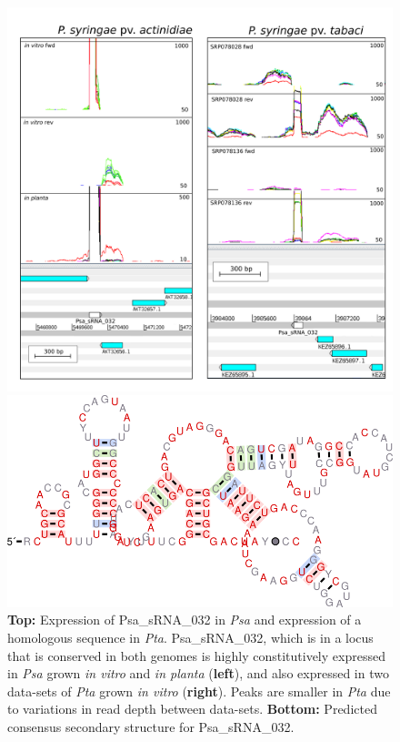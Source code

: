 \begin{figure}[H]
\centering
    \includegraphics[scale=1.05]{psa/psa_ncRNA/tabaci_and_psa.png}
    \begin{minipage}{0.6\textwidth}
\includegraphics[scale=0.9]{psa/psa_ncRNA/sRNA_032.png}
    \end{minipage}
    \begin{minipage}{0.39\textwidth}
    \caption[Expression of a Psa\_sRNA\_032 in \textit{Psa} and \textit{Pta}]{\textbf{Top:} Expression of Psa\_sRNA\_032 in \textit{Psa} and expression of a homologous sequence in \textit{Pta}. Psa\_sRNA\_032, which is in a locus that is conserved in both genomes is highly constitutively expressed in \textit{Psa} grown \textit{in vitro} and \textit{in planta} (\textbf{left}), and also expressed in two data-sets of \textit{Pta} grown \textit{in vitro} (\textbf{right}). Peaks are smaller in \textit{Pta} due to variations in read depth between data-sets. \textbf{Bottom:} Predicted consensus secondary structure for Psa\_sRNA\_032.}
    \label{fig:srna_032}
    \end{minipage}
\end{figure}

